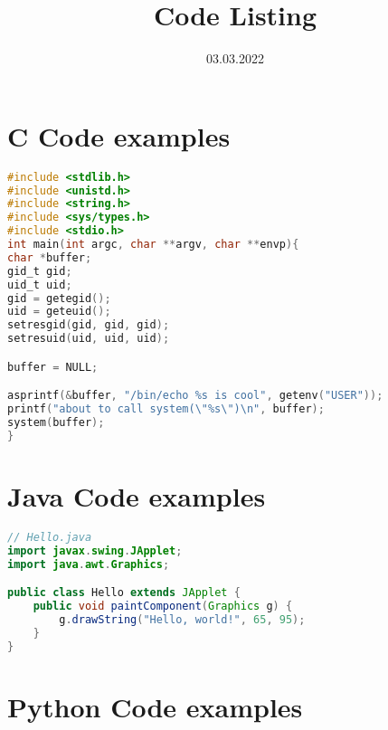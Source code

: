 \documentclass{article}
\title{Code Listing}
\date{ 03.03.2022}
\begin{document}
\maketitle  


\section{C Code examples}

\begin{lstlisting}[caption={level2.c},label={lst:lst2},language=C]
#include <stdlib.h>
#include <unistd.h>
#include <string.h>
#include <sys/types.h>
#include <stdio.h>
int main(int argc, char **argv, char **envp){
char *buffer;
gid_t gid;
uid_t uid;
gid = getegid();
uid = geteuid();
setresgid(gid, gid, gid);
setresuid(uid, uid, uid);

buffer = NULL;

asprintf(&buffer, "/bin/echo %s is cool", getenv("USER"));
printf("about to call system(\"%s\")\n", buffer);
system(buffer);
}
\end{lstlisting}

\newpage 

\section{Java Code examples}

\begin{lstlisting}[language=Java, caption=Java example]
// Hello.java
import javax.swing.JApplet;
import java.awt.Graphics;

public class Hello extends JApplet {
    public void paintComponent(Graphics g) {
        g.drawString("Hello, world!", 65, 95);
    }    
}
\end{lstlisting}


\newpage 

\section{Python Code examples}
\end{document}
